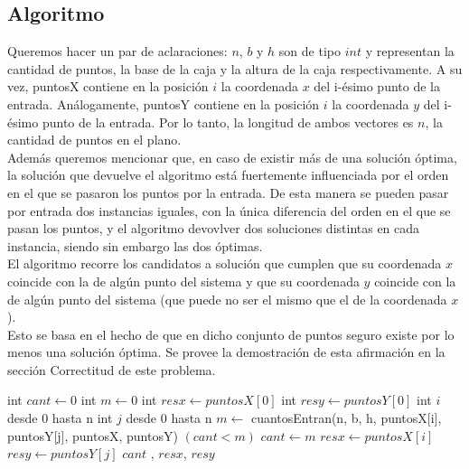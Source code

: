 \subsection{Algoritmo} 

\indent Queremos hacer un par de aclaraciones: $n$, $b$ y $h$ son de tipo $int$ y representan la cantidad de puntos, la base de la caja y la altura de la caja respectivamente. A su vez, puntosX contiene en la posici\'on $i$ la coordenada $x$ del i-\'esimo punto de la entrada. An\'alogamente, puntosY contiene en la posici\'on $i$ la coordenada $y$ del i-\'esimo punto de la entrada. Por lo tanto, la longitud de ambos vectores es $n$, la cantidad de puntos en el plano.\\
\indent Adem\'as queremos mencionar que, en caso de existir m\'as de una soluci\'on \'optima, la soluci\'on que devuelve el algoritmo est\'a fuertemente influenciada por el orden en el que se pasaron los puntos por la entrada. De esta manera se pueden pasar por entrada dos instancias iguales, con la \'unica diferencia del orden en el que se pasan los puntos, y el algoritmo devovlver dos soluciones distintas en cada instancia, siendo sin embargo las dos \'optimas.\\
\indent El algoritmo recorre los candidatos a soluci\'on que cumplen que su coordenada $x$ coincide con la de alg\'un punto del sistema y que su coordenada $y$ coincide con la de alg\'un punto del sistema (que puede no ser el mismo que el de la coordenada $x$).\\
\indent Esto se basa en el hecho de que en dicho conjunto de puntos seguro existe por lo menos una soluci\'on \'optima. Se provee la demostraci\'on de esta afirmaci\'on en la secci\'on Correctitud de este problema.\\


\begin{algorithm}[H]
\caption{} 
\begin{codebox}
\li int $cant \gets 0$
\li int $m \gets 0$
\li int $resx \gets puntosX[0]$
\li int $resy \gets puntosY[0]$
\li \For int $i$ desde 0 hasta n \Do
\li		\For int $j$ desde 0 hasta n \Do
\li 		$m \gets $ cuantosEntran(n, b, h, puntosX[i], puntosY[j], puntosX, puntosY)
\li 		\If $(cant<m)$ 
\li				\Then   $cant \gets m$
\li 					$resx \gets puntosX[i]$
\li 					$resy \gets puntosY[j]$
				\End
			\End
		\End
	\End
\li \Return $cant$ , $resx$, $resy$

\End
\end{codebox}
\end{algorithm}


